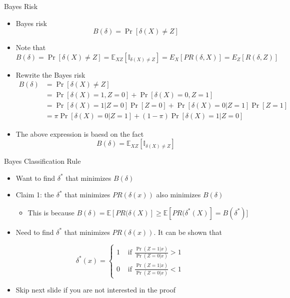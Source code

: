 \documentclass[
  ignorenonframetext,
]{beamer}
\providecommand{\tightlist}{%
  \setlength{\itemsep}{0pt}\setlength{\parskip}{0pt}}
\begin{document}
\begin{frame}{Bayes Risk}
\protect\hypertarget{bayes-risk}{}
\begin{itemize}
\item
  Bayes risk \[B(\delta)=\Pr [\delta(X)\not= Z]\]
\item
  Note that
  \[B(\delta)=\Pr [\delta(X)\not= Z]=\mathbb E_{XZ} [\mathbb I_{\delta(X)\not= Z}]=E_X[PR(\delta, X)]=E_Z[R(\delta, Z)]\]
\item
  Rewrite the Bayes risk \[\begin{aligned}
  B(\delta) &=\Pr [\delta(X)\not= Z]\\
  &=\Pr [\delta(X)=1, Z=0] + \Pr [\delta(X)=0, Z=1]\\
  &=\Pr [\delta(X)=1| Z=0]\Pr[Z=0] + \Pr [\delta(X)=0| Z=1] \Pr[Z=1]\\
  &=\pi \Pr [\delta(X)=0| Z=1]+ (1-\pi)\Pr [\delta(X)=1| Z=0]
  \end{aligned}\]
\item
  The above expression is baesd on the fact
  \[B(\delta)=\mathbb E_{XZ} [\mathbb I_{\delta(X)\not= Z}]\]
\end{itemize}
\end{frame}

\begin{frame}{Bayes Classification Rule}
\protect\hypertarget{bayes-classification-rule}{}
\begin{itemize}
\tightlist
\item
  Want to find \(\delta^*\) that minimizes \(B(\delta)\)
\item
  Claim 1: the \(\delta^*\) that minimizes \(PR(\delta(x))\) also
  minimizes \(B(\delta)\)

  \begin{itemize}
  \tightlist
  \item
    This is because
    \(B(\delta)=\mathbb E[PR(\delta(X)]\ge \mathbb E[PR(\delta^*(X)]=B(\delta^*)\){]}
  \end{itemize}
\item
  Need to find \(\delta^*\) that minimizes \(PR(\delta(x))\). It can be
  shown that
\end{itemize}

\[\delta^*(x)=\left\{
\begin{array}{cc}
1 & \mbox{ if } \frac{\Pr(Z=1|x)}{\Pr(Z=0|x)}>1\\
0 & \mbox{ if } \frac{\Pr(Z=1|x)}{\Pr(Z=0|x)}<1
\end{array}\right.\]

\begin{itemize}
\tightlist
\item
  Skip next slide if you are not interested in the proof
\end{itemize}
\end{frame}
\end{document}
